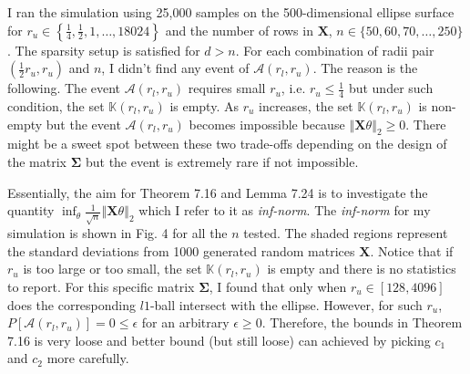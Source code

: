 \documentclass[a4paper, 11pt]{article}
\begin{document}
I ran the simulation using 25,000 samples on the 500-dimensional ellipse surface for $r_u\in\left\{\frac{1}{4}, \frac{1}{2}, 1, \dots, 18024\right\}$ and the number of rows in $\mathbf{X}$, $n\in\{50,60,70,\dots,250\}$. The sparsity setup is satisfied for $d > n$. For each combination of radii pair $(\frac{1}{2}r_u, r_u)$ and $n$, I didn't find any event of $\mathcal{A}(r_l, r_u)$. The reason is the following. The event $\mathcal{A}(r_l, r_u)$ requires small $r_u$, i.e. $r_u\leq\frac{1}{4}$ but under such condition, the set $\mathbb{K}(r_l, r_u)$ is empty. As $r_u$ increases, the set $\mathbb{K}(r_l, r_u)$ is non-empty but the event $\mathcal{A}(r_l, r_u)$ becomes impossible because $\left\Vert\mathbf{X}\theta \right\Vert_2 \geq 0$. There might be a sweet spot between these two trade-offs depending on the design of the matrix $\mathbf{\Sigma}$ but the event is extremely rare if not impossible. 



Essentially, the aim for Theorem 7.16 and Lemma 7.24 is to investigate the quantity $\inf_\theta \frac{1}{\sqrt{n}}\left\Vert\mathbf{X}\theta \right\Vert_2$ which I refer to it as \textit{inf-norm}. The \textit{inf-norm} for my simulation is shown in Fig. 4 for all the $n$ tested. The shaded regions represent the standard deviations from 1000 generated random matrices $\mathbf{X}$. Notice that if $r_u$ is too large or too small, the set $\mathbb{K}(r_l, r_u)$ is empty and there is no statistics to report. For this specific matrix $\mathbf{\Sigma}$, I found that only when $r_u\in[128, 4096]$ does the corresponding $l1$-ball intersect with the ellipse. However, for such $r_u$, $P\left[\mathcal{A}(r_l, r_u)\right] = 0 \leq \epsilon$ for an arbitrary $\epsilon\geq 0$. Therefore, the bounds in Theorem 7.16 is very loose and better bound (but still loose)  can achieved by picking $c_1$ and $c_2$ more carefully. 
\end{document}
